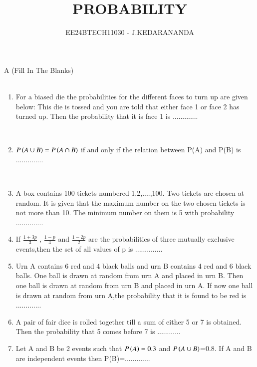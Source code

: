 \documentclass[journal,12pt,twocolumn]{IEEEtran}
\theoremstyle{remark}
\begin{document}

\vspace{3cm}

\title{PROBABILITY}
\author{EE24BTECH11030 - J.KEDARANANDA}
\maketitle
\newpage
\bigskip

\renewcommand{\thefigure}{\theenumi}
\renewcommand{\thetable}{\theenumi}
A  (Fill In The Blanks)\\\\
\begin{enumerate}
    \item For a biased die the probabilities for the different faces to turn up are given below:
    \bigskip
    This die is tossed and you are told that either face 1 or face 2 has turned up. Then the probability that it is face 1 is .............
    
    \hfill{}\\
    
    \item $P\left(A \cup B\right)=P\left(A \cap B \right)$ if and only if the relation between P(A) and P(B) is .............. 
    
    \hfill{}\\
    \item A box contains 100 tickets numbered 1,2,....,100. Two tickets are chosen at random. It is given that the maximum number on the two chosen tickets is not more than 10. The minimum number on them is 5 with probability ..............\hfill{}\\
    \item If $\frac{1+3p}{3}$ , $\frac{1-p}{4}$ and $\frac{1-2p}{2}$ are the probabilities of three mutually exclusive events,then the set of all values of p is ..............\hfill{}\\
    \item Urn A contains 6 red and 4 black balls and urn B contains 4 red and 6 black balls. One ball is drawn at random from urn A and placed in urn B. Then one ball is drawn at random from urn B and placed in urn A. If now one ball is drawn at random from urn A,the probability that it is found to be red is .............\hfill{}\\
    \item A pair of fair dice is rolled together till a sum of either 5 or 7 is obtained. Then the probability that 5 comes before 7 is 
    ............
    \hfill{}\\
    \item Let A and B be 2 events such that $P\left(A\right)=0.3$ and $P\left(A \cup B\right)$=0.8. If A and B are independent events then P(B)=.............\hfill{}\\
    

\end{enumerate}
\end{document}
